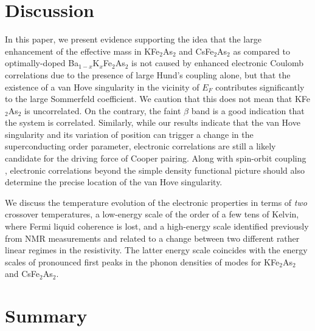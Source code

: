 \documentclass[twocolumn,aps,showpacs,preprintnumbers,amsmath,amssymb, superscriptaddress,longbibliography]{revtex4-1}
\begin{document}
\section{Discussion}

In this paper, we present evidence supporting the idea that the large enhancement of the effective mass in KFe$_2$As$_2$ and CsFe$_2$As$_2$ as compared to optimally-doped Ba$_{1-x}$K$_{x}$Fe$_2$As$_2$ is not caused by enhanced electronic Coulomb correlations due to the presence of large Hund's coupling alone, but that the existence of a van Hove singularity in the vicinity of $E_F$ contributes significantly to the large Sommerfeld coefficient. We caution that this does not mean that KFe$_2$As$_2$ is uncorrelated. On the contrary, the faint $\beta$ band is a good indication that the system is correlated. Similarly, while our results indicate that the van Hove singularity and its variation of position can trigger a change in the superconducting order parameter, electronic correlations are still a likely candidate for the driving force of Cooper pairing.  Along with spin-orbit coupling \cite{Drechsler_PSSB254}, electronic correlations beyond the simple density functional picture should also determine the precise location of the van Hove singularity.

We discuss the temperature evolution of the electronic properties in terms
of {\it two} crossover temperatures, a low-energy scale of the order of a
few tens of Kelvin, where Fermi liquid coherence is lost, and a high-energy scale identified previously from NMR measurements and related to
a change between two different rather linear regimes in the resistivity.
The latter energy scale coincides with the energy scales of pronounced
first peaks in the phonon densities of modes for KFe$_2$As$_2$ and
CsFe$_2$As$_2$.
\vspace{0.3cm}

\section{Summary}
\end{document}

